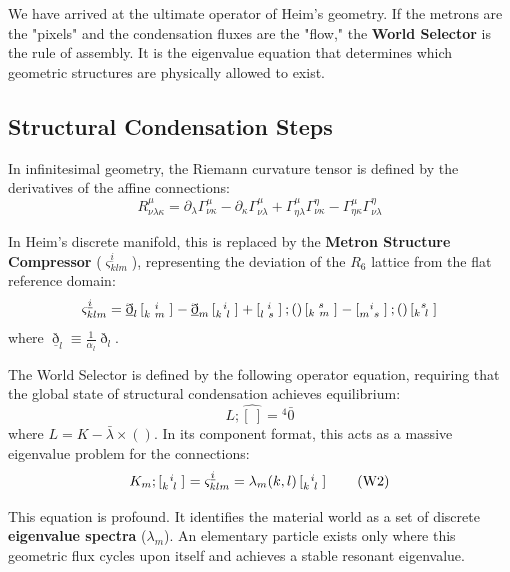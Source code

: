 \documentclass[11pt,a4paper,oneside]{article}
\newcommand{\ethop}{\eth}
\newcommand{\metroncap}[4][]{%
    \left[ \renewcommand{\arraystretch}{0.85} \substack{#2 \\ #3 \ #4} \right]_{#1}%
}
\begin{document}
We have arrived at the ultimate operator of Heim’s geometry. If the metrons are the "pixels" and the condensation fluxes are the "flow," the \textbf{World Selector} is the rule of assembly. It is the eigenvalue equation that determines which geometric structures are physically allowed to exist.

\subsection{Structural Condensation Steps}

In infinitesimal geometry, the Riemann curvature tensor is defined by the derivatives of the affine connections:
\begin{equation*}
    R^\mu_{\nu\lambda\kappa} = \partial_\lambda \Gamma^\mu_{\nu\kappa} - \partial_\kappa \Gamma^\mu_{\nu\lambda} + \Gamma^\mu_{\eta\lambda}\Gamma^\eta_{\nu\kappa} - \Gamma^\mu_{\eta\kappa}\Gamma^\eta_{\nu\lambda}
\end{equation*}

In Heim's discrete manifold, this is replaced by the \textbf{Metron Structure Compressor} ($\varsigma^{\underline{i}}_{klm}$), representing the deviation of the $R_6$ lattice from the flat reference domain:
\begin{equation*}
    \varsigma^{\underline{i}}_{klm} = \underline{\ethop}_l \metroncap{i}{k\ m}{ } - \underline{\ethop}_m \metroncap{i}{k\ l}{ } + \metroncap{i}{l\ s}{ };() \metroncap{s}{k\ m}{ } - \metroncap{i}{m\ s}{ };() \metroncap{s}{k\ l}{ }
\end{equation*}
where $\underline{\ethop}_l \equiv \frac{1}{\alpha_l}\ethop_l$.

The World Selector is defined by the following operator equation, requiring that the global state of structural condensation achieves equilibrium:
\begin{equation}
    L;\widehat{[\ ]} = {}^4\bar{0} \tag{W1}
\end{equation}
where $L = K - \bar{\lambda} \times ()$. In its component format, this acts as a massive eigenvalue problem for the connections:
\begin{equation}
    K_m; \metroncap{i}{k\ l}{ } = \varsigma^{\underline{i}}_{klm} = \lambda_m(k, l) \metroncap{i}{k\ l}{ } \tag{W2}
\end{equation}

This equation is profound. It identifies the material world as a set of discrete \textbf{eigenvalue spectra} ($\lambda_m$). An elementary particle exists only where this geometric flux cycles upon itself and achieves a stable resonant eigenvalue.
\end{document}
